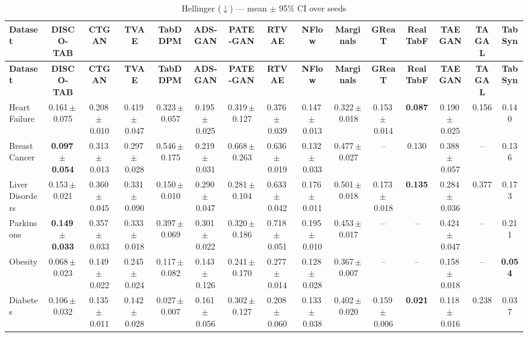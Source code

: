 \documentclass[8pt]{extarticle}
\begin{document}
\begin{longtable}{l*{14}{c}}
\caption{Hellinger ($\downarrow$) --- mean $\pm$ 95\% CI over seeds}\\
\toprule
\textbf{Dataset} & \textbf{DISCO-TAB} & \textbf{CTGAN} & \textbf{TVAE} & \textbf{TabDDPM} & \textbf{ADS-GAN} & \textbf{PATE-GAN} & \textbf{RTVAE} & \textbf{NFlow} & \textbf{Marginals} & \textbf{GReaT} & \textbf{RealTabF} & \textbf{TAEGAN} & \textbf{TAGAL} & \textbf{TabSyn} \\
\midrule
\endfirsthead
\toprule
\textbf{Dataset} & \textbf{DISCO-TAB} & \textbf{CTGAN} & \textbf{TVAE} & \textbf{TabDDPM} & \textbf{ADS-GAN} & \textbf{PATE-GAN} & \textbf{RTVAE} & \textbf{NFlow} & \textbf{Marginals} & \textbf{GReaT} & \textbf{RealTabF} & \textbf{TAEGAN} & \textbf{TAGAL} & \textbf{TabSyn} \\
\midrule
\endhead
\bottomrule
\endfoot
Heart Failure & 0.161\,$\pm$\,0.075 & 0.208\,$\pm$\,0.010 & 0.419\,$\pm$\,0.047 & 0.323\,$\pm$\,0.057 & 0.195\,$\pm$\,0.025 & 0.319\,$\pm$\,0.127 & 0.376\,$\pm$\,0.039 & 0.147\,$\pm$\,0.013 & 0.322\,$\pm$\,0.018 & 0.153\,$\pm$\,0.014 & \textbf{0.087} & 0.190\,$\pm$\,0.025 & 0.156 & 0.140 \\
Breast Cancer & \textbf{0.097\,$\pm$\,0.054} & 0.313\,$\pm$\,0.013 & 0.297\,$\pm$\,0.028 & 0.546\,$\pm$\,0.175 & 0.219\,$\pm$\,0.031 & 0.668\,$\pm$\,0.263 & 0.636\,$\pm$\,0.019 & 0.132\,$\pm$\,0.033 & 0.477\,$\pm$\,0.027 & -- & 0.130 & 0.388\,$\pm$\,0.057 & -- & 0.136 \\
Liver Disorders & 0.153\,$\pm$\,0.021 & 0.360\,$\pm$\,0.045 & 0.331\,$\pm$\,0.090 & 0.150\,$\pm$\,0.010 & 0.290\,$\pm$\,0.047 & 0.281\,$\pm$\,0.104 & 0.633\,$\pm$\,0.042 & 0.176\,$\pm$\,0.011 & 0.501\,$\pm$\,0.018 & 0.173\,$\pm$\,0.018 & \textbf{0.135} & 0.284\,$\pm$\,0.036 & 0.377 & 0.173 \\
Parkinsons & \textbf{0.149\,$\pm$\,0.033} & 0.357\,$\pm$\,0.033 & 0.333\,$\pm$\,0.018 & 0.397\,$\pm$\,0.069 & 0.301\,$\pm$\,0.022 & 0.320\,$\pm$\,0.186 & 0.718\,$\pm$\,0.051 & 0.195\,$\pm$\,0.010 & 0.453\,$\pm$\,0.017 & -- & -- & 0.424\,$\pm$\,0.047 & -- & 0.211 \\
Obesity & 0.068\,$\pm$\,0.023 & 0.149\,$\pm$\,0.022 & 0.245\,$\pm$\,0.024 & 0.117\,$\pm$\,0.082 & 0.143\,$\pm$\,0.126 & 0.241\,$\pm$\,0.170 & 0.277\,$\pm$\,0.014 & 0.128\,$\pm$\,0.028 & 0.367\,$\pm$\,0.007 & -- & -- & 0.158\,$\pm$\,0.018 & -- & \textbf{0.054} \\
Diabetes & 0.106\,$\pm$\,0.032 & 0.135\,$\pm$\,0.011 & 0.142\,$\pm$\,0.028 & 0.027\,$\pm$\,0.007 & 0.161\,$\pm$\,0.056 & 0.302\,$\pm$\,0.127 & 0.208\,$\pm$\,0.060 & 0.133\,$\pm$\,0.038 & 0.402\,$\pm$\,0.020 & 0.159\,$\pm$\,0.006 & \textbf{0.021} & 0.118\,$\pm$\,0.016 & 0.238 & 0.037 \\

\end{longtable}
\end{document}

